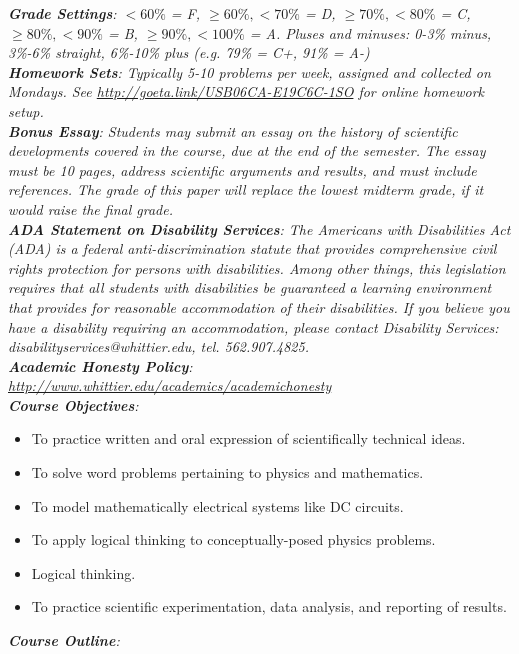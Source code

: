 \documentclass[10pt]{article}
\begin{document}
\textit{\textbf{Grade Settings}: $<60\%$ = F, $\geq 60\%, <70\%$ = D, $\geq 70\%, <80\%$ = C, $\geq 80\%, <90\%$ = B, $\geq 90\%, <100\%$ = A.  Pluses and minuses: 0-3\% minus, 3\%-6\% straight, 6\%-10\% plus (e.g. 79\% = C+, 91\% = A-)} \\
\textit{\textbf{Homework Sets}: Typically 5-10 problems per week, assigned and collected on Mondays.  See \url{http://goeta.link/USB06CA-E19C6C-1SO} for online homework setup.} \\
\textit{\textbf{Bonus Essay}: Students may submit an essay on the history of scientific developments covered in the course, due at
the end of the semester. The essay must be 10 pages, address scientific arguments and results, and must include
references. The grade of this paper will replace the lowest midterm grade, if it would raise the final grade.} \\
\textit{\textbf{ADA Statement on Disability Services}: The Americans with Disabilities Act (ADA) is a federal anti-discrimination statute that provides comprehensive civil rights protection for persons with disabilities. Among other things, this legislation requires that all students with disabilities be guaranteed a learning environment that provides for reasonable accommodation of their disabilities. If you believe you have a disability requiring an accommodation, please contact Disability Services: disabilityservices@whittier.edu, tel. 562.907.4825.} \\
\textit{\textbf{Academic Honesty Policy}: \url{http://www.whittier.edu/academics/academichonesty}} \\
\textit{\textbf{Course Objectives}:}
\begin{itemize}
\item To practice written and oral expression of scientifically technical ideas.
\item To solve word problems pertaining to physics and mathematics.
\item To model mathematically electrical systems like DC circuits.
\item To apply logical thinking to conceptually-posed physics problems.
\item Logical thinking.
\item To practice scientific experimentation, data analysis, and reporting of results.
\end{itemize}
\clearpage
\small
\textit{\textbf{Course Outline}:}
\end{document}
